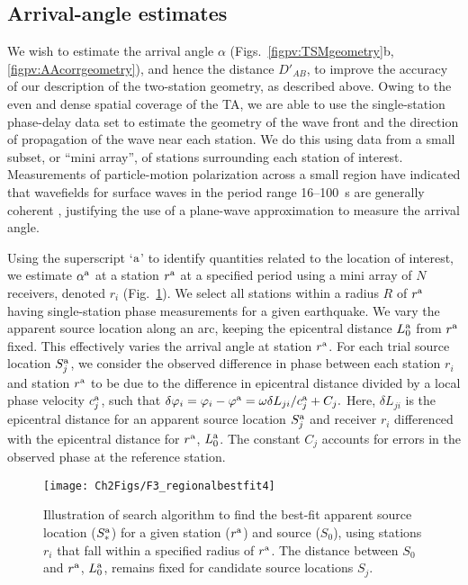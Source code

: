 \documentclass[12pt,oneside]{book}
\begin{document}
\subsection{Arrival-angle estimates}\label{sec:miniarraymethod}

We wish to estimate the arrival angle $\alpha$ (Figs.~\ref{figpv:TSMgeometry}b, \ref{figpv:AAcorrgeometry}), and hence the distance $D'_{AB}$, to improve the accuracy of our description of the two-station geometry, as described above. Owing to the even and dense spatial coverage of the TA, we are able to use the single-station phase-delay data set to estimate the geometry of the wave front and the direction of propagation of the wave near each station. We do this using data from a small subset, or ``mini array'', of stations surrounding each station of interest. Measurements of particle-motion polarization across a small region have indicated that wavefields for surface waves in the period range 16--100~s are generally coherent \citep{Tanimoto2007}, justifying the use of a plane-wave approximation to measure the arrival angle. 

Using the superscript `$\rm{a}$' to identify quantities related to the location of interest, we estimate $\alpha^{\rm{a}}$ at a station $r^{\rm{a}}$ at a specified period using a mini array of $N$ receivers, denoted $r_i$ (Fig.~\ref{figpv:BFillus}). We select all stations within a radius $R$ of $r^{\rm{a}}$ having single-station phase measurements for a given earthquake. We vary the apparent source location along an arc, keeping the epicentral distance $L^{\rm{a}}_{\rm{0}}$ from $r^{\rm{a}}$ fixed. This effectively varies the arrival angle at station $r^{\rm{a}}$. For each trial source location $S^{\rm{a}}_j$, we consider the observed difference in phase between each station $r_i$ and station $r^{\rm{a}}$ to be due to the difference in epicentral distance divided by a local phase velocity $c^{\rm{a}}_j$, such that 
$\delta\varphi_{i} = \varphi_{i}-\varphi^{\rm{a}} = \omega \delta L_{ji} / c^{\rm{a}}_j + C_j.$ Here, $\delta L_{ji}$ is the epicentral distance for an apparent source location $S^{\rm{a}}_j$ and receiver $r_i$ differenced with the epicentral distance for $r^{\rm{a}}$, $L^{\rm{a}}_{\rm{0}}$. The constant $C_j$ accounts for errors in the observed phase at the reference station. 

\begin{figure} 
\begin{center}
\texttt{[image: Ch2Figs/F3\_regionalbestfit4]} 
\caption[Mini-array method illustration]{Illustration of search algorithm to find the best-fit apparent source location ($S^{\rm{a}}_{\ast}$) for a given station ($r^{\rm{a}}$) and source ($S_{0}$), using stations $r_i$ that fall within a specified radius of $r^{\rm{a}}$. The distance between $S_{0}$ and $r^{\rm{a}}$, 
$L^{\rm{a}}_{0}$, remains fixed for candidate source locations $S_{j}$. }
\label{figpv:BFillus}
\end{center}
\end{figure}
%
\end{document}
